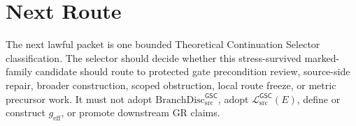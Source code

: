\documentclass[11pt]{article}
\newcommand{\MetricData}{\mathcal{L}_{\mathrm{src}}^{\mathsf{GSC}}}
\newcommand{\geff}{g_{\mathrm{eff}}}
\newcommand{\BranchDisc}{\mathrm{BranchDisc}_{\mathrm{src}}^{\mathsf{GSC}}}
\begin{document}
\section{Next Route}

The next lawful packet is one bounded Theoretical Continuation Selector
classification. The selector should decide whether this stress-survived
marked-family candidate should route to protected gate precondition review,
source-side repair, broader construction, scoped obstruction, local route
freeze, or metric precursor work. It must not adopt \(\BranchDisc\), adopt
\(\MetricData(E)\), define or construct \(\geff\), or promote downstream GR
claims.
\end{document}
